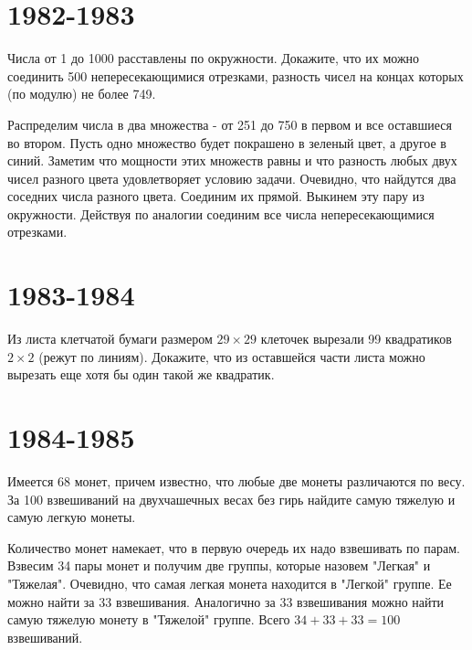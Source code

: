 \documentclass[11pt, a4paper]{template}
\begin{document}
\chapter{1982-1983}

\begin{exercise}
Числа от 1 до 1000 расставлены по окружности. Докажите, что их можно соединить 500 непересекающимися отрезками, разность чисел на концах которых (по модулю) не более 749.
\end{exercise}

\begin{solution}
Распределим числа в два множества - от 251 до 750 в первом и все оставшиеся во втором. Пусть одно множество будет покрашено в зеленый цвет, а другое в синий. Заметим что мощности этих множеств равны и что разность любых двух чисел разного цвета удовлетворяет условию задачи. Очевидно, что найдутся два соседних числа разного цвета. Соединим их прямой. Выкинем эту пару из окружности. Действуя по аналогии соединим все числа непересекающимися отрезками. 
\end{solution}

\chapter{1983-1984}

\begin{exercise}
Из листа клетчатой бумаги размером $29 \times 29$ клеточек вырезали 99 квадратиков $2 \times 2$ (режут по линиям). Докажите, что из оставшейся части листа можно вырезать еще хотя бы один такой же квадратик.
\end{exercise}

\chapter{1984-1985}

\begin{exercise}
Имеется 68 монет, причем известно, что любые две монеты различаются по весу. За 100 взвешиваний на \newline двухчашечных весах без гирь найдите самую тяжелую и самую легкую монеты.
\end{exercise}

\begin{solution}
Количество монет намекает, что в первую очередь их надо взвешивать по парам. Взвесим 34 пары монет и получим две группы, которые назовем "Легкая" и "Тяжелая". Очевидно, что самая легкая монета находится в "Легкой" группе. Ее можно найти за 33 взвешивания. Аналогично за 33 взвешивания можно найти самую тяжелую монету в "Тяжелой" группе. Всего $34 + 33 + 33 = 100$ взвешиваний.
\end{solution}
\end{document}
